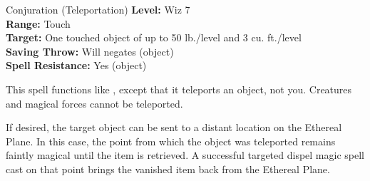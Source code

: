 {Conjuration (Teleportation)}
{
	\textbf{Level:}
	Wiz 7\\
	\textbf{Range:}
	Touch\\
	\textbf{Target:}
	One touched object of up to 50 lb./level and 3 cu. ft./level\\
	\textbf{Saving Throw:}
	Will negates (object)\\
	\textbf{Spell Resistance:}
	Yes (object)\\
}
{
	This spell functions like , except that it teleports an object, not you. Creatures and magical forces cannot be teleported.

	If desired, the target object can be sent to a distant location on the Ethereal Plane. In this case, the point from which the object was teleported remains faintly magical until the item is retrieved. A successful targeted dispel magic spell cast on that point brings the vanished item back from the Ethereal Plane.

}
